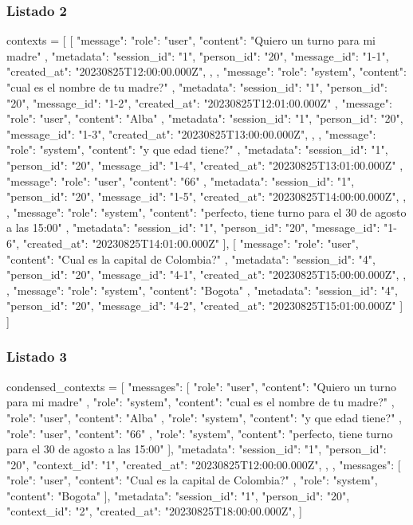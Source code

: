 \subsubsection{Listado 2}
\label{anexo:code-4-1-7-2}

\begin{APACode}
contexts = [
[
{
"message": {
"role": "user",
"content": "Quiero un turno para mi madre"
},
"metadata": { 
"session_id": "1",
"person_id": "20",
"message_id": "1-1",
"created_at": "20230825T12:00:00.000Z",
},
},
{
"message": {
"role": "system",
"content": "cual es el nombre de tu madre?"
},
"metadata": {
"session_id": "1",
"person_id": "20",
"message_id": "1-2",
"created_at": "20230825T12:01:00.000Z"
}
},
{
"message": {
"role": "user",
"content": "Alba"
},
"metadata": {
"session_id": "1",
"person_id": "20",
"message_id": "1-3",
"created_at": "20230825T13:00:00.000Z",
},
},
{
"message": {
"role": "system",
"content": "y que edad tiene?"
},
"metadata": {
"session_id": "1",
"person_id": "20",
"message_id": "1-4",
"created_at": "20230825T13:01:00.000Z"
}
},
{
"message": {
"role": "user",
"content": "66"
},
"metadata": {
"session_id": "1",
"person_id": "20",
"message_id": "1-5",
"created_at": "20230825T14:00:00.000Z",
},
},
{
"message": {
"role": "system",
"content": "perfecto, tiene turno para el 30 de agosto a las 15:00"
},
"metadata": {
"session_id": "1",
"person_id": "20",
"message_id": "1-6",
"created_at": "20230825T14:01:00.000Z"
}
}
], 
[
{
"message": {
"role": "user",
"content": "Cual es la capital de Colombia?"
},
"metadata": {
"session_id": "4",
"person_id": "20",
"message_id": "4-1",
"created_at": "20230825T15:00:00.000Z",
},
},
{
"message": {
"role": "system",
"content": "Bogota"
},
"metadata": {
"session_id": "4",
"person_id": "20",
"message_id": "4-2",
"created_at": "20230825T15:01:00.000Z"
}
}
]
]
\end{APACode}

\subsubsection{Listado 3}
\label{anexo:code-4-1-7-3}

\begin{APACode}
condensed_contexts = [
{
"messages": [
{
"role": "user",
"content": "Quiero un turno para mi madre"
},
{
"role": "system",
"content": "cual es el nombre de tu madre?"
},
{
"role": "user",
"content": "Alba"
},
{
"role": "system",
"content": "y que edad tiene?"
},
{
"role": "user",
"content": "66"
},
{
"role": "system",
"content": "perfecto, tiene turno para el 30 de agosto a las 15:00"
}
],
"metadata": { 
"session_id": "1",
"person_id": "20",
"context_id": "1",
"created_at": "20230825T12:00:00.000Z",
},
},
{
"messages": [
{
"role": "user",
"content": "Cual es la capital de Colombia?"
},
{
"role": "system", 
"content": "Bogota"
}
],
"metadata": {
"session_id": "1",
"person_id": "20",
"context_id": "2",
"created_at": "20230825T18:00:00.000Z",
}
}
]
\end{APACode}

